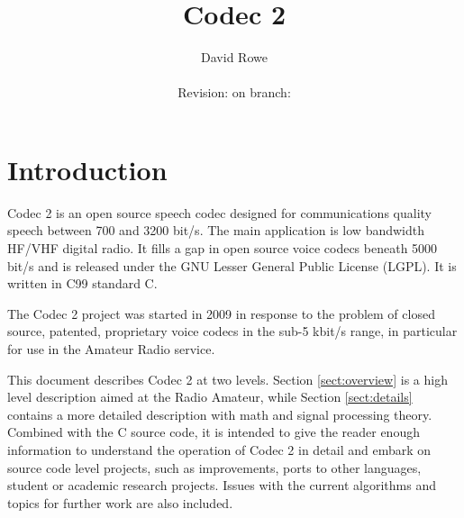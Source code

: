 \documentclass{article}
\title{Codec 2}
\author{David Rowe\\ \\ Revision: {\gitrevision} on branch: {\branch}}
\begin{document}


\newcommand{\drawSine}[4]{%

\draw plot [smooth] coordinates {(#1-2*#3, #2 )       (#1-1.5*#3,#2+0.707*#4)
                                 (#1-1*#3, #2+1*#4)   (#1-0.5*#3,#2+0.707*#4)
                                 (#1  ,#2+0)          (#1+0.5*#3,#2-0.707*#4) 
                                 (#1+1*#3,#2-1*#4)    (#1+1.5*#3,#2-0.707*#4)
                                 (#1+2*#3,#2+0)}
}

\newcommand{\drawSummer}[2]{%
	\draw (#1,#2) circle (0.5);
	\draw (#1-0.25,#2) -- (#1+0.25,#2);
	\draw (#1,#2-0.25) -- (#1,#2+0.25);
}

\newcommand{\drawMultiplier}[2]{%
	\draw (#1,#2) circle (0.5);
	\draw (#1-0.25,#2-0.25) -- (#1+0.25,#2+0.25);
	\draw (#1-0.25,#2+0.25) -- (#1+0.25,#2-0.25);
}

\maketitle

\section{Introduction}

Codec 2 is an open source speech codec designed for communications quality speech between 700 and 3200 bit/s. The main application is low bandwidth HF/VHF digital radio. It fills a gap in open source voice codecs beneath 5000 bit/s and is released under the GNU Lesser General Public License (LGPL).  It is written in C99 standard C.

The Codec 2 project was started in 2009 in response to the problem of closed source, patented, proprietary voice codecs in the sub-5 kbit/s range, in particular for use in the Amateur Radio service.

This document describes Codec 2 at two levels.  Section \ref{sect:overview} is a high level description aimed at the Radio Amateur, while Section \ref{sect:details} contains a more detailed description with math and signal processing theory.  Combined with the C source code, it is intended to give the reader enough information to understand the operation of Codec 2 in detail and embark on source code level projects, such as improvements, ports to other languages, student or academic research projects.  Issues with the current algorithms and topics for further work are also included.
\end{document}
